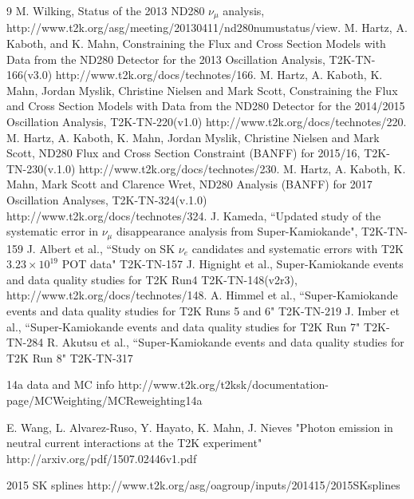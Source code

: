\begin{thebibliography}{9}
  M. Wilking,
  Status of the 2013 ND280 $\nu_{\mu}$ analysis,\\
  http://www.t2k.org/asg/meeting/20130411/nd280numustatus/view.
  M. Hartz, A. Kaboth, and K. Mahn,
  Constraining the Flux and Cross Section Models with Data from the
  ND280 Detector for the 2013 Oscillation Analysis,
  T2K-TN-166(v3.0)
  http://www.t2k.org/docs/technotes/166.
  M. Hartz, A. Kaboth, K. Mahn, Jordan Myslik, Christine Nielsen and Mark Scott,
  Constraining the Flux and Cross Section Models with Data from the
  ND280 Detector for the 2014/2015 Oscillation Analysis,
  T2K-TN-220(v1.0)
  http://www.t2k.org/docs/technotes/220.
  M. Hartz, A. Kaboth, K. Mahn, Jordan Myslik, Christine Nielsen and Mark Scott,
 ND280 Flux and Cross Section Constraint (BANFF) for 2015/16,
  T2K-TN-230(v.1.0)
  http://www.t2k.org/docs/technotes/230.
  M. Hartz, A. Kaboth, K. Mahn, Mark Scott and Clarence Wret,
  ND280 Analysis (BANFF) for 2017 Oscillation Analyses,
  T2K-TN-324(v.1.0)
  http://www.t2k.org/docs/technotes/324.
J. Kameda,
``Updated study of the systematic error in $\nu_{\mu}$ disappearance analysis from Super-Kamiokande",
T2K-TN-159
J. Albert et al.,
``Study on SK $\nu_e$ candidates and systematic errors with T2K $3.23 \times 10^{19}$ POT data"
T2K-TN-157
   J. Hignight et al.,
   Super-Kamiokande events and data quality studies for T2K Run4
   T2K-TN-148(v2r3),
   http://www.t2k.org/docs/technotes/148.
  A. Himmel et al.,
  ``Super-Kamiokande events and data quality studies for T2K Runs 5 and 6"
  T2K-TN-219
  J. Imber et al.,
  ``Super-Kamiokande events and data quality studies for T2K Run 7"
  T2K-TN-284
  R. Akutsu et al.,
  ``Super-Kamiokande events and data quality studies for T2K Run 8"
  T2K-TN-317
%
%

   14a data and MC info
   http://www.t2k.org/t2ksk/documentation-page/MCWeighting/MCReweighting14a

   E. Wang, L. Alvarez-Ruso, Y. Hayato, K. Mahn, J. Nieves
   "Photon emission in neutral current interactions at the T2K experiment"
   http://arxiv.org/pdf/1507.02446v1.pdf

   2015 SK splines
   http://www.t2k.org/asg/oagroup/inputs/201415/2015SKsplines


\end{thebibliography}
